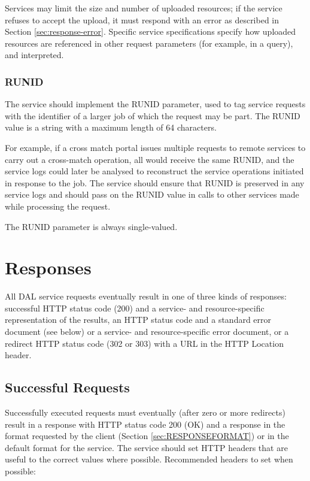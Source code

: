 \documentclass[11pt,letter]{ivoa}
\begin{document}
Services may limit the size and number of uploaded resources; if the service 
refuses to accept the upload, it must respond with an error as described in 
Section \ref{sec:response-error}. Specific service specifications specify how uploaded resources are 
referenced in other request parameters (for example, in a query), and 
interpreted.

\subsubsection{RUNID}
\label{sec:RUNID}
The service should implement the RUNID parameter, used to tag service requests 
with the identifier of a larger job of which the request may be part. The RUNID 
value is a string with a maximum length of 64 characters.

For example, if a cross match portal issues multiple requests to remote services 
to carry out a cross-match operation, all would receive the same RUNID, and the 
service logs could later be analysed to reconstruct the service operations 
initiated in response to the job. The service should ensure that RUNID is 
preserved in any service logs and  should pass on the RUNID value in calls to 
other services made while processing the request.

The RUNID parameter is always single-valued.

\section{Responses}
\label{sec:responses}
All DAL service requests eventually result in one of three kinds of responses: 
successful HTTP status code (200) and a service- and resource-specific 
representation of the results, an HTTP status code and a standard error document 
(see below) or a  service- and resource-specific error document, or a redirect 
HTTP status code (302 or 303) with a URL in the HTTP Location header.

\subsection{Successful Requests}
\label{sec:response-ok}
Successfully executed requests must eventually (after zero or more redirects) 
result in a response with HTTP status code 200 (OK) and a response in the format 
requested by the client (Section \ref{sec:RESPONSEFORMAT}) or in the default format for the 
service. The service should set HTTP headers \citep{std:HTTP} that are useful to the correct values 
where possible. Recommended headers to set when possible:
\end{document}
